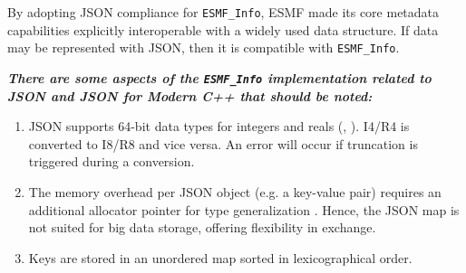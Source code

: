 By adopting JSON compliance for \texttt{ESMF\_Info}, ESMF made its core metadata capabilities explicitly interoperable with a widely used data structure. If data may be represented with JSON, then it is compatible with \texttt{ESMF\_Info}.

\textbf{\textit{There are some aspects of the \texttt{ESMF\_Info} implementation related to JSON and \textit{JSON for Modern C++} that should be noted:}}
\begin{enumerate}
    \item JSON supports 64-bit data types for integers and reals (\cite{json_for_modern_cpp_64bit_int}, \cite{json_for_modern_cpp_64bit_float}). I4/R4 is converted to I8/R8 and vice versa. An error will occur if truncation is triggered during a conversion.
    \item The memory overhead per JSON object (e.g. a key-value pair) requires an additional allocator pointer for type generalization \cite{json_for_modern_cpp_memory_overhead}. Hence, the JSON map is not suited for big data storage, offering flexibility in exchange.
    \item Keys are stored in an unordered map sorted in lexicographical order.
\end{enumerate}

